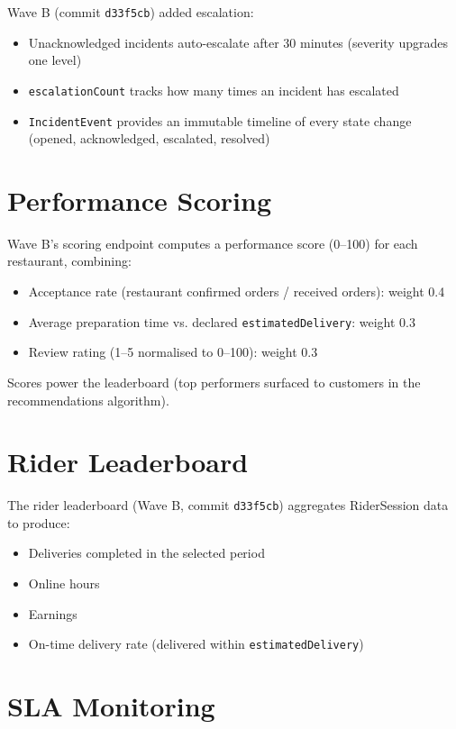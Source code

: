 \documentclass[11pt,a4paper,twoside]{book}
\begin{document}
Wave B (commit \texttt{d33f5cb}) added escalation:

\begin{itemize}[leftmargin=1.4em]
  \item Unacknowledged incidents auto-escalate after 30 minutes (severity upgrades one level)
  \item \texttt{escalationCount} tracks how many times an incident has escalated
  \item \texttt{IncidentEvent} provides an immutable timeline of every state change (opened, acknowledged, escalated, resolved)
\end{itemize}

\section{Performance Scoring}

Wave B's scoring endpoint computes a performance score (0–100) for each
restaurant, combining:

\begin{itemize}[leftmargin=1.4em,nosep]
  \item Acceptance rate (restaurant confirmed orders / received orders): weight 0.4
  \item Average preparation time vs. declared \texttt{estimatedDelivery}: weight 0.3
  \item Review rating (1–5 normalised to 0–100): weight 0.3
\end{itemize}

Scores power the leaderboard (top performers surfaced to customers in the
recommendations algorithm).

\section{Rider Leaderboard}

The rider leaderboard (Wave B, commit \texttt{d33f5cb}) aggregates RiderSession
data to produce:

\begin{itemize}[leftmargin=1.4em,nosep]
  \item Deliveries completed in the selected period
  \item Online hours
  \item Earnings
  \item On-time delivery rate (delivered within \texttt{estimatedDelivery})
\end{itemize}

\section{SLA Monitoring}
\end{document}

